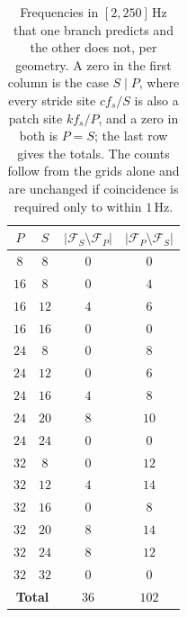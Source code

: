 \begin{table}[!b]
    \centering
    \small
    \renewcommand{\arraystretch}{1.15}
    \begin{tabular}{@{}cccc@{}}
        \toprule
        \textbf{$P$} & \textbf{$S$} &
        $|\mathcal{F}_{S}\setminus\mathcal{F}_{P}|$ & $|\mathcal{F}_{P}\setminus\mathcal{F}_{S}|$ \\
        \midrule
        $8$ & $8$ & $0$ & $0$ \\
        \midrule
        $16$ & $8$ & $0$ & $4$ \\
        $16$ & $12$ & $4$ & $6$ \\
        $16$ & $16$ & $0$ & $0$ \\
        \midrule
        $24$ & $8$ & $0$ & $8$ \\
        $24$ & $12$ & $0$ & $6$ \\
        $24$ & $16$ & $4$ & $8$ \\
        $24$ & $20$ & $8$ & $10$ \\
        $24$ & $24$ & $0$ & $0$ \\
        \midrule
        $32$ & $8$ & $0$ & $12$ \\
        $32$ & $12$ & $4$ & $14$ \\
        $32$ & $16$ & $0$ & $8$ \\
        $32$ & $20$ & $8$ & $14$ \\
        $32$ & $24$ & $8$ & $12$ \\
        $32$ & $32$ & $0$ & $0$ \\
        \midrule
        \multicolumn{2}{c}{\textbf{Total}} & $36$ & $102$ \\
        \bottomrule
    \end{tabular}
\caption{Frequencies in $[2,250]$\,Hz that one branch predicts and the other does not, per geometry. A zero in the first column is the case $S\mid P$, where every stride site $cf_s/S$ is also a patch site $kf_s/P$, and a zero in both is $P=S$; the last row gives the totals. The counts follow from the grids alone and are unchanged if coincidence is required only to within $1$\,Hz.}%
    \label{tab:branchSites}
\end{table}
